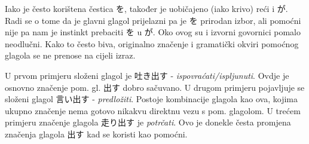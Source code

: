 	Iako je često korištena čestica を, također je uobičajeno (iako krivo) reći i が. Radi se o tome da je glavni glagol prijelazni pa je を prirodan izbor, ali pomoćni nije pa nam je instinkt prebaciti を u が. Oko ovog su i izvorni govornici pomalo neodlučni. Kako to često biva, originalno značenje i gramatički okviri pomoćnog glagola se ne prenose na cijeli izraz.
	
	\newpage
	\begin{reibun}
	\end{reibun}

	U prvom primjeru složeni glagol je 吐き出す - \textit{ispovraćati/ispljunuti}. Ovdje je osnovno značenje pom. gl. 出す dobro sačuvano. U drugom primjeru pojavljuje se složeni glagol 言い出す - \textit{predložiti}. Postoje kombinacije glagola kao ova, kojima ukupno značenje nema gotovo nikakvu direktnu vezu s pom. glagolom. U trećem primjeru značenje glagola 走り出す je \textit{potrčati}. Ovo je donekle česta promjena značenja glagola 出す kad se koristi kao pomoćni.
	
	\begin{reibun}
	\end{reibun}
	
	\begin{reibun}
	\end{reibun}

